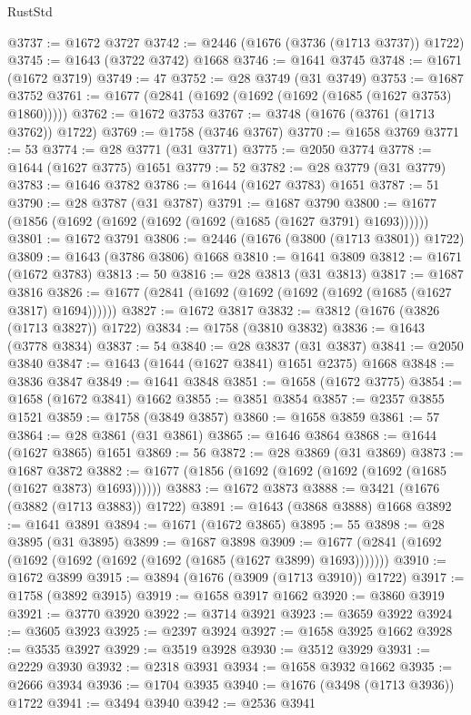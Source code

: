 \begin{lexlean}{RustStd}
\begin{coremodule}
@3737 := @1672 @3727
@3742 := @2446 (@1676 (@3736 (@1713 @3737)) @1722)
@3745 := @1643 (@3722 @3742) @1668
@3746 := @1641 @3745
@3748 := @1671 (@1672 @3719)
@3749 := 47
@3752 := @28 @3749 (@31 @3749)
@3753 := @1687 @3752
@3761 := @1677 (@2841 (@1692 (@1692 (@1692 (@1685 (@1627 @3753) @1860)))))
@3762 := @1672 @3753
@3767 := @3748 (@1676 (@3761 (@1713 @3762)) @1722)
@3769 := @1758 (@3746 @3767)
@3770 := @1658 @3769
@3771 := 53
@3774 := @28 @3771 (@31 @3771)
@3775 := @2050 @3774
@3778 := @1644 (@1627 @3775) @1651
@3779 := 52
@3782 := @28 @3779 (@31 @3779)
@3783 := @1646 @3782
@3786 := @1644 (@1627 @3783) @1651
@3787 := 51
@3790 := @28 @3787 (@31 @3787)
@3791 := @1687 @3790
@3800 := @1677 (@1856 (@1692 (@1692 (@1692 (@1692 (@1685 (@1627 @3791) @1693))))))
@3801 := @1672 @3791
@3806 := @2446 (@1676 (@3800 (@1713 @3801)) @1722)
@3809 := @1643 (@3786 @3806) @1668
@3810 := @1641 @3809
@3812 := @1671 (@1672 @3783)
@3813 := 50
@3816 := @28 @3813 (@31 @3813)
@3817 := @1687 @3816
@3826 := @1677 (@2841 (@1692 (@1692 (@1692 (@1692 (@1685 (@1627 @3817) @1694))))))
@3827 := @1672 @3817
@3832 := @3812 (@1676 (@3826 (@1713 @3827)) @1722)
@3834 := @1758 (@3810 @3832)
@3836 := @1643 (@3778 @3834)
@3837 := 54
@3840 := @28 @3837 (@31 @3837)
@3841 := @2050 @3840
@3847 := @1643 (@1644 (@1627 @3841) @1651 @2375) @1668
@3848 := @3836 @3847
@3849 := @1641 @3848
@3851 := @1658 (@1672 @3775)
@3854 := @1658 (@1672 @3841) @1662
@3855 := @3851 @3854
@3857 := @2357 @3855 @1521
@3859 := @1758 (@3849 @3857)
@3860 := @1658 @3859
@3861 := 57
@3864 := @28 @3861 (@31 @3861)
@3865 := @1646 @3864
@3868 := @1644 (@1627 @3865) @1651
@3869 := 56
@3872 := @28 @3869 (@31 @3869)
@3873 := @1687 @3872
@3882 := @1677 (@1856 (@1692 (@1692 (@1692 (@1692 (@1685 (@1627 @3873) @1693))))))
@3883 := @1672 @3873
@3888 := @3421 (@1676 (@3882 (@1713 @3883)) @1722)
@3891 := @1643 (@3868 @3888) @1668
@3892 := @1641 @3891
@3894 := @1671 (@1672 @3865)
@3895 := 55
@3898 := @28 @3895 (@31 @3895)
@3899 := @1687 @3898
@3909 := @1677 (@2841 (@1692 (@1692 (@1692 (@1692 (@1692 (@1685 (@1627 @3899) @1693)))))))
@3910 := @1672 @3899
@3915 := @3894 (@1676 (@3909 (@1713 @3910)) @1722)
@3917 := @1758 (@3892 @3915)
@3919 := @1658 @3917 @1662
@3920 := @3860 @3919
@3921 := @3770 @3920
@3922 := @3714 @3921
@3923 := @3659 @3922
@3924 := @3605 @3923
@3925 := @2397 @3924
@3927 := @1658 @3925 @1662
@3928 := @3535 @3927
@3929 := @3519 @3928
@3930 := @3512 @3929
@3931 := @2229 @3930
@3932 := @2318 @3931
@3934 := @1658 @3932 @1662
@3935 := @2666 @3934
@3936 := @1704 @3935
@3940 := @1676 (@3498 (@1713 @3936)) @1722
@3941 := @3494 @3940
@3942 := @2536 @3941

\end{coremodule}
\end{lexlean}
